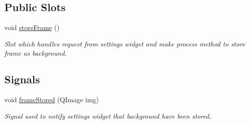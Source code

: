 \subsection*{Public Slots}
\begin{DoxyCompactItemize}
\item 
\hypertarget{class_module_background_a1497e000d7884ab48bc25d151efb66b5}{
void \hyperlink{class_module_background_a1497e000d7884ab48bc25d151efb66b5}{storeFrame} ()}
\label{d0/deb/class_module_background_a1497e000d7884ab48bc25d151efb66b5}

\begin{DoxyCompactList}\small\item\em Slot which handles request from settings widget and make process method to store frame as background. \item\end{DoxyCompactList}\end{DoxyCompactItemize}
\subsection*{Signals}
\begin{DoxyCompactItemize}
\item 
void \hyperlink{class_module_background_af64eba4df25c1c23cb0d5c27c36d9778}{frameStored} (QImage img)
\begin{DoxyCompactList}\small\item\em Signal used to notify settings widget that background have been stored. \item\end{DoxyCompactList}\end{DoxyCompactItemize}
